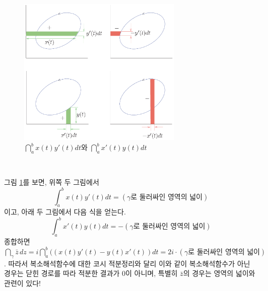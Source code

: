 \begin{figure}[!h]
\begin{center}
\includegraphics[width=0.7\textwidth]{./SaltChapter/figs/fig-3-14}
\end{center}
\caption{$\dint_a^b x(t)y'(t)dt$와 $\dint_a^b x'(t)y(t)dt$
}
\label{fig-3-14}
\end{figure}

\

그림 \ref{fig-3-14}를 보면,  
위쪽 두 그림에서
\[
\int_a^b x(t)y'(t)dt = (\gamma\text{로 둘러싸인 영역의 넓이})
\]
이고, 아래 두 그림에서 다음 식을 얻는다.
\[
\int_a^b x'(t)y(t)dt = - (\gamma\text{로 둘러싸인 영역의 넓이})
\]
종합하면 $\dint_\gamma \bar z\, dz = i\dint_a^b ((x(t)y'(t)-y(t)x'(t))dt
= 2i\cdot (\gamma\text{로 둘러싸인 영역의 넓이})$.
따라서 복소해석함수에 대한 코시 적분정리와 달리
이와 같이 복소해석함수가 아닌 경우는 닫힌 경로를 따라 적분한 결과가
$0$이 아니며, 
특별히 $\bar z$의 경우는 영역의 넓이와 관련이 있다!

